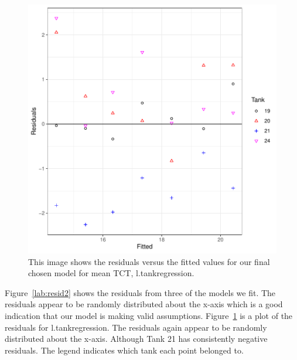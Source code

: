 \begin{figure}[H]
\includegraphics{Chapter3Images/ltankregressionresid.pdf}
\caption{\hspace{1mm} This image shows the residuals versus the fitted values for our final chosen model for mean TCT, l.tankregression.}
\label{lab:resid22}
\end{figure}

Figure~\ref{lab:resid2} shows the residuals from three of the models we fit. The residuals appear to be randomly distributed about the x-axis which is a good indication that our model is making valid assumptions. Figure~\ref{lab:resid22} is a plot of the residuals for l.tankregression. The residuals again appear to be randomly distributed about the x-axis. Although Tank 21 has consistently negative residuals. The legend indicates which tank each point belonged to.


